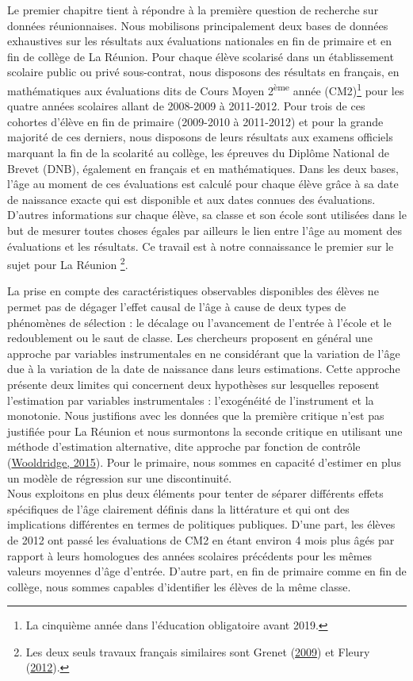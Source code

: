 \documentclass[
]{book}
\begin{document}
\quad Le premier chapitre tient à répondre à la première question de recherche sur données réunionnaises. Nous mobilisons principalement deux bases de données exhaustives sur les résultats aux évaluations nationales en fin de primaire et en fin de collège de La Réunion. Pour chaque élève scolarisé dans un établissement scolaire public ou privé sous-contrat, nous disposons des résultats en français, en mathématiques aux évaluations dits de Cours Moyen 2\textsuperscript{ème} année (CM2)\footnote{La cinquième année dans l'éducation obligatoire avant 2019.} pour les quatre années scolaires allant de 2008-2009 à 2011-2012. Pour trois de ces cohortes d'élève en fin de primaire (2009-2010 à 2011-2012) et pour la grande majorité de ces derniers, nous disposons de leurs résultats aux examens officiels marquant la fin de la scolarité au collège, les épreuves du Diplôme National de Brevet (DNB), également en français et en mathématiques. Dans les deux bases, l'âge au moment de ces évaluations est calculé pour chaque élève grâce à sa date de naissance exacte qui est disponible et aux dates connues des évaluations. D'autres informations sur chaque élève, sa classe et son école sont utilisées dans le but de mesurer toutes choses égales par ailleurs le lien entre l'âge au moment des évaluations et les résultats. Ce travail est à notre connaissance le premier sur le sujet pour La Réunion \footnote{Les deux seuls travaux français similaires sont Grenet (\protect\hyperlink{ref-GRE:09}{2009}) et Fleury (\protect\hyperlink{ref-FLE:12}{2012}).}.

La prise en compte des caractéristiques observables disponibles des élèves ne permet pas de dégager l'effet causal de l'âge à cause de deux types de phénomènes de sélection : le décalage ou l'avancement de l'entrée à l'école et le redoublement ou le saut de classe. Les chercheurs proposent en général une approche par variables instrumentales en ne considérant que la variation de l'âge due à la variation de la date de naissance dans leurs estimations. Cette approche présente deux limites qui concernent deux hypothèses sur lesquelles reposent l'estimation par variables instrumentales : l'exogénéité de l'instrument et la monotonie. Nous justifions avec les données que la première critique n'est pas justifiée pour La Réunion et nous surmontons la seconde critique en utilisant une méthode d'estimation alternative, dite approche par fonction de contrôle (\protect\hyperlink{ref-WOO:15}{Wooldridge, 2015}). Pour le primaire, nous sommes en capacité d'estimer en plus un modèle de régression sur une discontinuité. \\
Nous exploitons en plus deux éléments pour tenter de séparer différents effets spécifiques de l'âge clairement définis dans la littérature et qui ont des implications différentes en termes de politiques publiques. D'une part, les élèves de 2012 ont passé les évaluations de CM2 en étant environ 4 mois plus âgés par rapport à leurs homologues des années scolaires précédents pour les mêmes valeurs moyennes d'âge d'entrée. D'autre part, en fin de primaire comme en fin de collège, nous sommes capables d'identifier les élèves de la même classe.
\end{document}
